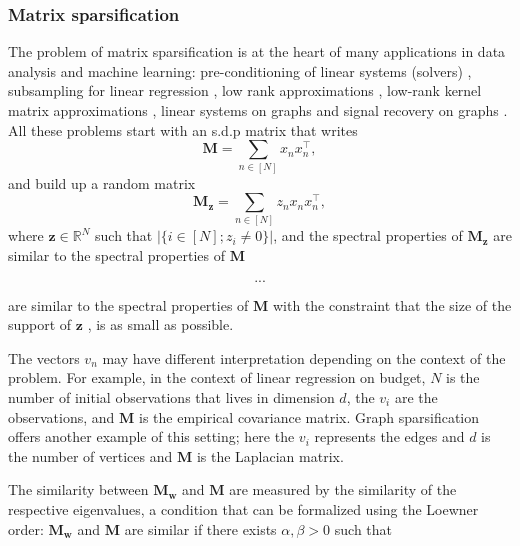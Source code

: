 \documentclass[twoside,11pt]{book}
\numberwithin{theorem}{chapter}
\numberwithin{definition}{chapter}
\numberwithin{proposition}{chapter}
\numberwithin{corollary}{chapter}
\numberwithin{example}{chapter}
\numberwithin{lemma}{chapter}
\numberwithin{assumption}{chapter}
\DeclareMathOperator{\Tran}{\intercal}
\begin{document}
\subsubsection{Matrix sparsification}
The problem of matrix sparsification is at the heart of many applications in data analysis and machine learning: pre-conditioning of linear systems (solvers) \citep{Golub1965}, subsampling for linear regression \citep*{DrMaMu06}, low rank approximations \citep*{DrMaMu07}, low-rank kernel matrix approximations \citep{Bac13,AlMa15}, linear systems on graphs \citep*{SpTe04,SpSr11} and signal recovery on graphs \citep*{PuTrGrVa18}. All these problems start with an s.d.p matrix that writes
\begin{equation}
\bm{M} = \sum\limits_{n \in [N]} x_{n}x_{n}^{\Tran},
\end{equation}
and build up a random matrix 
\begin{equation}
\bm{M}_{\bm{z}} = \sum\limits_{n \in [N]} z_{n} x_{n}x_{n}^{\Tran},
\end{equation}
where $\bm{z} \in \mathbb{R}^{N}$ such that $|\{ i \in [N]; z_{i} \neq 0 \}|$, and the spectral properties of $\bm{M}_{\bm{z}}$ are similar to the spectral properties of $\bm{M}$

\begin{equation}
...
\end{equation}


  are similar to the spectral properties of $\bm{M}$ with the constraint that the size of the support of $\bm{z}$ ,  is as small as possible. 



The vectors $v_{n}$ may have different interpretation depending on the context of the problem. For example, in the context of linear regression on budget, $N$ is the number of initial observations that lives in dimension $d$, the $v_{i}$ are the observations, and $\bm{M}$ is the empirical covariance matrix. Graph sparsification offers another example of this setting; here the $v_{i}$ represents the edges and $d$ is the number of vertices and $\bm{M}$ is the Laplacian matrix.




The similarity between $\bm{M}_{\bm{w}}$ and $\bm{M}$ are measured by the similarity of the respective eigenvalues, a condition that can be formalized using the Loewner order: $\bm{M}_{\bm{w}}$ and $\bm{M}$  are similar if there exists $\alpha,\beta>0$ such that
\end{document}
